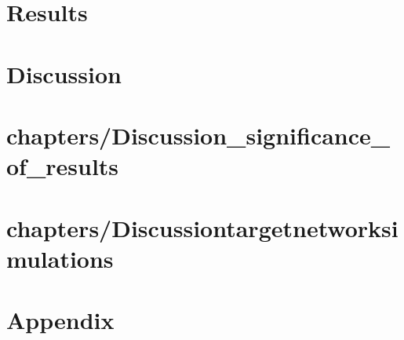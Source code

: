 \documentclass[12pt,letterpaper]{report}
\begin{document}
\chapter{Results}










\chapter{Discussion}

\chapter{chapters/Discussion_significance_of_results}
\chapter{chapters/Discussiontargetnetworksimulations}

\chapter{Appendix}





{\singlespace

}
\renewcommand{\chaptername}{APPENDIX}
\appendix


\end{document}
